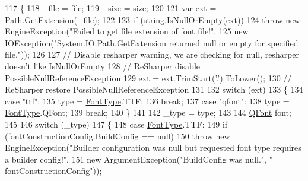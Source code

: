 \begin{DoxyCode}
117         \{
118             \_file = file;
119             \_size = size;
120 
121             var ext = Path.GetExtension(\_file);
122 
123             \textcolor{keywordflow}{if} (\textcolor{keywordtype}{string}.IsNullOrEmpty(ext))
124                 \textcolor{keywordflow}{throw} \textcolor{keyword}{new} EngineException(\textcolor{stringliteral}{"Failed to get file extension of font file!"},
125                                           \textcolor{keyword}{new} IOException(\textcolor{stringliteral}{"System.IO.Path.GetExtension returned null or
       empty for specified file."}));
126 
127             \textcolor{comment}{// Disable resharper warning, we are checking for null, resharper doesn't like IsNullOrEmpty}
128             \textcolor{comment}{// ReSharper disable PossibleNullReferenceException}
129             ext = ext.TrimStart(\textcolor{charliteral}{'.'}).ToLower();
130             \textcolor{comment}{// ReSharper restore PossibleNullReferenceException}
131 
132             \textcolor{keywordflow}{switch} (ext)
133             \{
134                 \textcolor{keywordflow}{case} \textcolor{stringliteral}{"ttf"}:
135                     type = \hyperlink{namespace_tri_devs_1_1_tri_engine_1_1_text_a823573b800952d8909dc50e1efa3358b}{FontType}.TTF;
136                     \textcolor{keywordflow}{break};
137                 \textcolor{keywordflow}{case} \textcolor{stringliteral}{"qfont"}:
138                     type = \hyperlink{namespace_tri_devs_1_1_tri_engine_1_1_text_a823573b800952d8909dc50e1efa3358b}{FontType}.QFont;
139                     \textcolor{keywordflow}{break};
140             \}
141 
142             \_type = type;
143 
144             \hyperlink{class_tri_devs_1_1_tri_engine_1_1_text_1_1_font_ad39abcf6c6505e2d522b27a8ff65e554}{QFont} font;
145 
146             \textcolor{keywordflow}{switch} (\_type)
147             \{
148                 \textcolor{keywordflow}{case} \hyperlink{namespace_tri_devs_1_1_tri_engine_1_1_text_a823573b800952d8909dc50e1efa3358b}{FontType}.TTF:
149                     \textcolor{keywordflow}{if} (fontConstructionConfig.BuildConfig == null)
150                         \textcolor{keywordflow}{throw} \textcolor{keyword}{new} EngineException(\textcolor{stringliteral}{"Builder configuration was null but requested font type
       requires a builder config!"},
151                                                   \textcolor{keyword}{new} ArgumentException(\textcolor{stringliteral}{"BuildConfig was null."}, \textcolor{stringliteral}{"
      fontConstructionConfig"}));

\end{DoxyCode}
